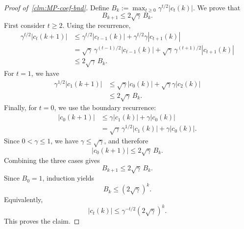 \documentclass[12pt]{article}
\begin{document}
\begin{proof}[Proof of~\cref{clm:MP-coef-bnd}]
  Define \( B_k:=\max_{t\ge0}\gamma^{t/2}|c_t(k)|. \) We prove that \[ B_{k+1}\le 2\sqrt{\gamma}\,B_k. \] First consider \(t\ge2\). Using the recurrence, \[ \begin{aligned} \gamma^{t/2}|c_t(k+1)| &\le \gamma^{t/2}|c_{t-1}(k)| + \gamma^{t/2}\gamma |c_{t+1}(k)| \\ &= \sqrt{\gamma}\,\gamma^{(t-1)/2}|c_{t-1}(k)| + \sqrt{\gamma}\,\gamma^{(t+1)/2}|c_{t+1}(k)| \\ &\le 2\sqrt{\gamma}\,B_k. \end{aligned} \] For \(t=1\), we have \[ \begin{aligned} \gamma^{1/2}|c_1(k+1)| &\le \sqrt{\gamma}|c_0(k)| + \sqrt{\gamma}\gamma |c_2(k)| \\ &\le 2\sqrt{\gamma}\,B_k. \end{aligned} \] Finally, for \(t=0\), we use the boundary recurrence: \[ \begin{aligned} |c_0(k+1)| &\le \gamma |c_1(k)|+\gamma |c_0(k)| \\ &= \sqrt{\gamma}\,\gamma^{1/2}|c_1(k)| + \gamma |c_0(k)|. \end{aligned} \] Since \(0<\gamma\le1\), we have \(\gamma\le \sqrt{\gamma}\), and therefore \[ |c_0(k+1)| \le 2\sqrt{\gamma}\,B_k. \] 
Combining the three cases gives \[ B_{k+1}\le 2\sqrt{\gamma}\,B_k. \] Since \(B_0=1\), induction yields \[ B_k\le (2\sqrt{\gamma})^k. \] Equivalently, \[ |c_t(k)| \le \gamma^{-t/2}(2\sqrt{\gamma})^k. \] This proves the claim. \end{proof}
\end{document}

